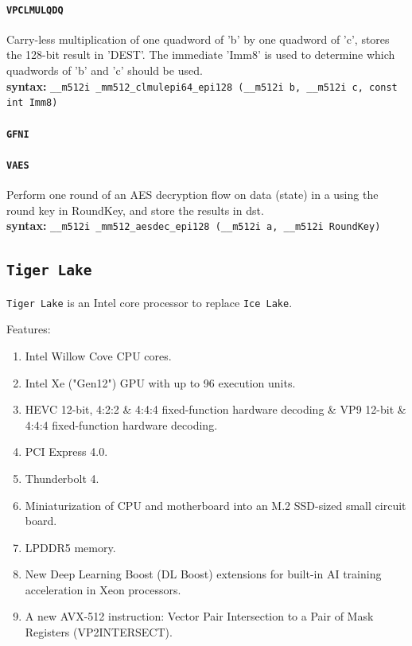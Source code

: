 \documentclass[10pt,onecolumn,conference]{IEEEtran}
\begin{document}
\paragraph{\texttt{VPCLMULQDQ}}
Carry-less multiplication of one quadword of 'b' by one quadword of 'c', stores the 128-bit result in 'DEST'. 
The immediate 'Imm8' is used to determine which quadwords of 'b' and 'c' should be used. \\
\textbf{syntax:} \texttt{\_\_m512i \_mm512\_clmulepi64\_epi128 (\_\_m512i b, \_\_m512i c, const int Imm8)}
\paragraph{\texttt{GFNI}}

\paragraph{\texttt{VAES}}
Perform one round of an AES decryption flow on data (state) in a using the round key in RoundKey, and store the results in dst.\\
\textbf{syntax:} \texttt{\_\_m512i \_mm512\_aesdec\_epi128 (\_\_m512i a, \_\_m512i RoundKey)}

\subsection{\texttt{Tiger Lake}}
\texttt{Tiger Lake} is an Intel core processor to replace \texttt{Ice Lake}.

Features:
\begin{enumerate}
\item Intel Willow Cove CPU cores.
\item Intel Xe ("Gen12") GPU with up to 96 execution units.
\item HEVC 12-bit, 4:2:2 \& 4:4:4 fixed-function hardware decoding \& VP9 12-bit \& 4:4:4 fixed-function hardware decoding.
\item PCI Express 4.0.
\item Thunderbolt 4.
\item Miniaturization of CPU and motherboard into an M.2 SSD-sized small circuit board.
\item LPDDR5 memory.
\item New Deep Learning Boost (DL Boost) extensions for built-in AI training acceleration in Xeon processors.
\item A new AVX-512 instruction: Vector Pair Intersection to a Pair of Mask Registers (VP2INTERSECT).
\end{enumerate}
\end{document}
